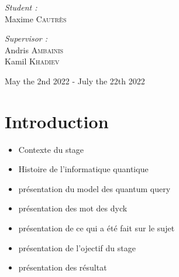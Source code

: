 \documentclass[11pt,a4paper]{article}
\theoremstyle{definition}
\theoremstyle{plain}
\theoremstyle{definition}
\begin{document}
\begin{titlepage}
\begin{sffamily}
\begin{center}
            \hspace{-0.8cm}
            \begin{minipage}{0.4\textwidth}
                \begin{flushleft} \large
                    \emph{Student :} \\
                    Maxime \textsc{Cautrès}\\
                \end{flushleft}
            \end{minipage}
            \hspace{3cm}
            \begin{minipage}{0.4\textwidth}
                \begin{flushright} \large
                    \emph{Supervisor :} \\
                    Andris \textsc{Ambainis}\\
                    Kamil \textsc{Khadiev}\\
                \end{flushright}
            \end{minipage}

            \vspace*{0.5cm}

            {\large   May the 2nd 2022 -  July the 22th 2022}
        \end{center}
    \end{sffamily}
\end{titlepage}

\tableofcontents

\newpage




\section{Introduction}

 {\color{red}
  \begin{itemize}
      \item Contexte du stage
      \item Histoire de l'informatique quantique
      \item présentation du model des quantum query
      \item présentation des mot des dyck
      \item présentation de ce qui a été fait sur le sujet
      \item présentation de l'ojectif du stage
      \item présentation des résultat
  \end{itemize}}
\end{document}
